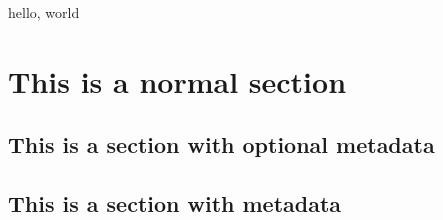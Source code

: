 \documentclass{amsart}
\begin{document}
hello, world

\section{This is a normal section}

\begin{sectionWithMetadata}
\section{This is a section with optional metadata}
\end{sectionWithMetadata}

\begin{sectionWithMetadata}
\section{This is a section with metadata}
\author{David M. Jones}
\end{sectionWithMetadata}
\end{document}
